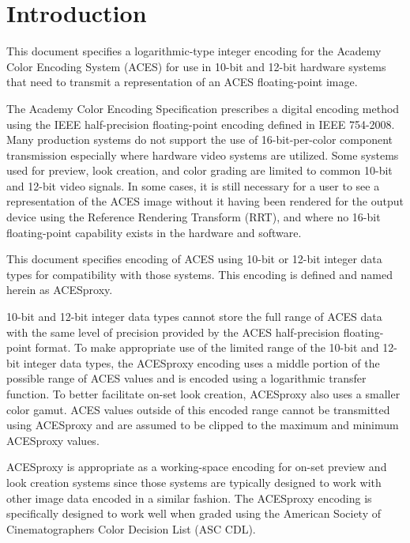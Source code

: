 \unnumberedformat	    %
\chapter{Introduction} 	%

This document specifies a logarithmic-type integer encoding for the Academy Color Encoding System (ACES) for use in 10-bit and 12-bit hardware systems that need to transmit a representation of an ACES floating-point image.

The Academy Color Encoding Specification prescribes a digital encoding method using the IEEE half-precision floating-point encoding defined in IEEE 754-2008. Many production systems do not support the use of 16-bit-per-color component transmission especially where hardware video systems are utilized. Some systems used for preview, look creation, and color grading are limited to common 10-bit and 12-bit video signals. In some cases, it is still necessary for a user to see a representation of the ACES image without it having been rendered for the output device using the Reference Rendering Transform (RRT), and where no 16-bit floating-point capability exists in the hardware and software.

This document specifies encoding of ACES using 10-bit or 12-bit integer data types for compatibility with those systems. This encoding is defined and named herein as ACESproxy.

10-bit and 12-bit integer data types cannot store the full range of ACES data with the same level of precision provided by the ACES half-precision floating-point format. To make appropriate use of the limited range of the 10-bit and 12-bit integer data types, the ACESproxy encoding uses a middle portion of the possible range of ACES values and is encoded using a logarithmic transfer function. To better facilitate on-set look creation, ACESproxy also uses a smaller color gamut. ACES values outside of this encoded range cannot be transmitted using ACESproxy and are assumed to be clipped to the maximum and minimum ACESproxy values.

ACESproxy is appropriate as a working-space encoding for on-set preview and look creation systems since those systems are typically designed to work with other image data encoded in a similar fashion. The ACESproxy encoding is specifically designed to work well when graded using the American Society of Cinematographers Color Decision List (ASC CDL).

